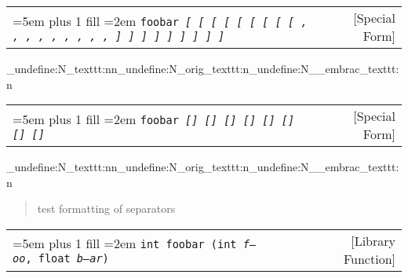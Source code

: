 \documentclass{book}
\newcommand\GNUTexinfocommandstyletextvar[1]{{\normalfont{}\textsl{#1}}}%
\begin{document}
%
\noindent\begin{tabularx}{\linewidth}{@{}Xr}
\rightskip=5em plus 1 fill
\hangindent=2em
\noindent\texttt{foobar \EmbracOn{}\textnormal{\textsl{[ \EmbracOff{}\textnormal{[}\EmbracOn{} \textsl{[} \texttt{[} \texttt{[} \EmbracOff{}\textnormal{\textsl{[}}\EmbracOn{} \EmbracOff{}\textnormal{\texttt{[}}\EmbracOn{} \EmbracOff{}\textnormal{\texttt{\textsl{[}}}\EmbracOn{} \EmbracOff{}\textnormal{\texttt{[}}\EmbracOn{} , \EmbracOff{}\textnormal{,}\EmbracOn{} \textsl{,} \texttt{,} \texttt{,} \EmbracOff{}\textnormal{\textsl{,}}\EmbracOn{} \EmbracOff{}\textnormal{\texttt{,}}\EmbracOn{} \EmbracOff{}\textnormal{\texttt{\textsl{,}}}\EmbracOn{} \EmbracOff{}\textnormal{\texttt{,}}\EmbracOn{} ] \EmbracOff{}\textnormal{]}\EmbracOn{} \textsl{]} \texttt{]} \texttt{]} \EmbracOff{}\textnormal{\textsl{]}}\EmbracOn{} \EmbracOff{}\textnormal{\texttt{]}}\EmbracOn{} \EmbracOff{}\textnormal{\texttt{\textsl{]}}}\EmbracOn{} \EmbracOff{}\textnormal{\texttt{]}}\EmbracOn{}}}\EmbracOff{}}& [Special Form]
\end{tabularx}
\ExplSyntaxOn%
\cs_undefine:N{\embrac_texttt:nn}\cs_undefine:N{\embrac_orig_texttt:n}\cs_undefine:N{\__embrac_texttt:n}%
\ExplSyntaxOff%

%

%
\noindent\begin{tabularx}{\linewidth}{@{}Xr}
\rightskip=5em plus 1 fill
\hangindent=2em
\noindent\texttt{foobar \EmbracOn{}\textnormal{\textsl{[] \EmbracOff{}\textnormal{[]}\EmbracOn{} \textsl{[]} \texttt{[]} \texttt{[]} \EmbracOff{}\textnormal{\textsl{[]}}\EmbracOn{} \EmbracOff{}\textnormal{\texttt{[]}}\EmbracOn{} \EmbracOff{}\textnormal{\texttt{\textsl{[]}}}\EmbracOn{}}}\EmbracOff{}}& [Special Form]
\end{tabularx}
\ExplSyntaxOn%
\cs_undefine:N{\embrac_texttt:nn}\cs_undefine:N{\embrac_orig_texttt:n}\cs_undefine:N{\__embrac_texttt:n}%
\ExplSyntaxOff%

%
\begin{quote}
\unskip{\parskip=0pt\noindent}%
test formatting of separators
\end{quote}


\noindent\begin{tabularx}{\linewidth}{@{}Xr}
\rightskip=5em plus 1 fill
\hangindent=2em
\noindent\texttt{int foobar (int\ \GNUTexinfocommandstyletextvar{f---oo},\ float\ \GNUTexinfocommandstyletextvar{b--ar})}& [Library Function]
\end{tabularx}
\end{document}
